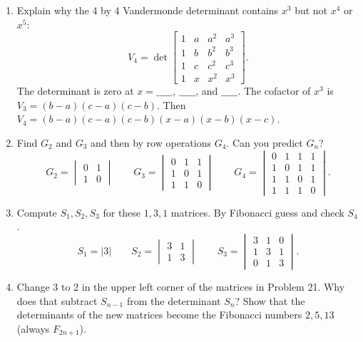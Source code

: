\documentclass[14pt, a4paper]{article}
\begin{document}
\begin{enumerate}[resume]
    \item Explain why the 4 by 4 Vandermonde determinant contains $x^3$ but not $x^4$ or $x^5$:
          \[
              V_4 = \det \begin{bmatrix} 1 & a & a^2 & a^3 \\ 1 & b & b^2 & b^3 \\ 1 & c & c^2 & c^3 \\ 1 & x & x^2 & x^3 \end{bmatrix} .
          \]
          The determinant is zero at $x = \_\_\_\_\_$, $\_\_\_\_\_$, and $\_\_\_\_\_$. The cofactor of $x^3$ is $V_3 = (b-a)(c-a)(c-b)$. Then $V_4 = (b-a)(c-a)(c-b)(x-a)(x-b)(x-c)$.

    \item Find $G_2$ and $G_3$ and then by row operations $G_4$. Can you predict $G_n$?
          \[
              G_2 = \begin{vmatrix} 0 & 1 \\ 1 & 0 \end{vmatrix} \qquad
              G_3 = \begin{vmatrix} 0 & 1 & 1 \\ 1 & 0 & 1 \\ 1 & 1 & 0 \end{vmatrix} \qquad
              G_4 = \begin{vmatrix} 0 & 1 & 1 & 1 \\ 1 & 0 & 1 & 1 \\ 1 & 1 & 0 & 1 \\ 1 & 1 & 1 & 0 \end{vmatrix} .
          \]

    \item Compute $S_1, S_2, S_3$ for these $1, 3, 1$ matrices. By Fibonacci guess and check $S_4$.
          \[
              S_1 = |3| \qquad
              S_2 = \begin{vmatrix} 3 & 1 \\ 1 & 3 \end{vmatrix} \qquad
              S_3 = \begin{vmatrix} 3 & 1 & 0 \\ 1 & 3 & 1 \\ 0 & 1 & 3 \end{vmatrix} .
          \]

    \item Change 3 to 2 in the upper left corner of the matrices in Problem 21. Why does that subtract $S_{n-1}$ from the determinant $S_n$? Show that the determinants of the new matrices become the Fibonacci numbers $2, 5, 13$ (always $F_{2n+1}$).
\end{enumerate}
\end{document}
